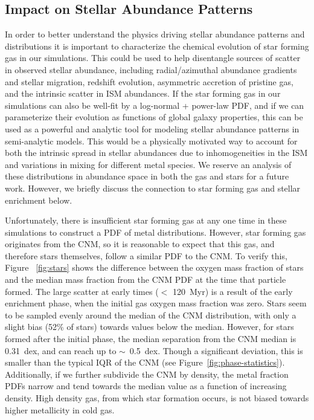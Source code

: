 \documentclass[twocolumn]{aastex61}
\begin{document}
\subsection{Impact on Stellar Abundance Patterns}
\label{sec:stellar abundances}
In order to better understand the physics driving stellar abundance patterns and distributions it is important to characterize the chemical evolution of star forming gas in our simulations. This could be used to help disentangle sources of scatter in observed stellar abundance, including radial/azimuthal abundance gradients and stellar migration, redshift evolution, asymmetric accretion of pristine gas, and the intrinsic scatter in ISM abundances. If the star forming gas in our simulations can also be well-fit by a log-normal + power-law PDF, and if we can parameterize their evolution as functions of global galaxy properties, this can be used as a powerful and analytic tool for modeling stellar abundance patterns in semi-analytic models. This would be a physically motivated way to account for both the intrinsic spread in stellar abundances due to inhomogeneities in the ISM and variations in mixing for different metal species. We reserve an analysis of these distributions in abundance space in both the gas and stars for a future work. However, we briefly discuss the connection to star forming gas and stellar enrichment below.

Unfortunately, there is insufficient star forming gas at any one time in these simulations to construct a PDF of metal distributions. However, star forming gas originates from the CNM, so it is reasonable to expect that this gas, and therefore stars themselves, follow a similar PDF to the CNM. To verify this, Figure ~\ref{fig:stars} shows the difference between the oxygen mass fraction of stars and the median mass fraction from the CNM PDF at the time that particle formed. The large scatter at early times ($<$ 120~Myr) is a result of the early enrichment phase, when the initial gas oxygen mass fraction was zero. Stars seem to be sampled evenly around the median of the CNM distribution, with only a slight bias (52\% of stars) towards values below the median. However, for stars formed after the initial phase, the median separation from the CNM median is 0.31~dex, and can reach up to $\sim$~0.5~dex. Though a significant deviation, this is smaller than the typical IQR of the CNM (see Figure~\ref{fig:phase-statistics}). Additionally, if we further subdivide the CNM by density, the metal fraction PDFs narrow and tend towards the median value as a function of increasing density. High density gas, from which star formation occurs, is not biased towards higher metallicity in cold gas.
\end{document}

